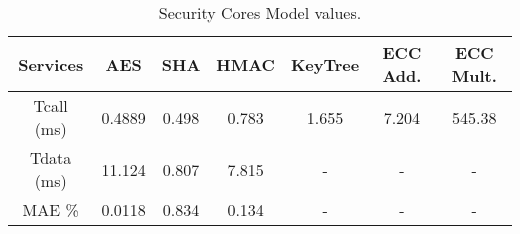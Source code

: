 \begin{table}[]
\centering
\def\arraystretch{1.5}
\begin{tabular}{|c|c|c|c|c|c|c|}
\hline
Services   & AES     & SHA    & HMAC    & KeyTree & ECC Add. & ECC Mult.   \\ \hline
Tcall (ms) & 0.4889  & 0.498  & 0.783   & 1.655   & 7.204   & 545.38 \\ \hline
Tdata (ms) & 11.124  & 0.807 & 7.815   & -       & -       & -      \\ \hline
MAE \%	   & 0.0118  & 0.834  & 0.134   & -	  & -	    & -   \\ \hline
\end{tabular}
\caption{Security Cores Model values.}
\label{tab:core-model}
\end{table}
